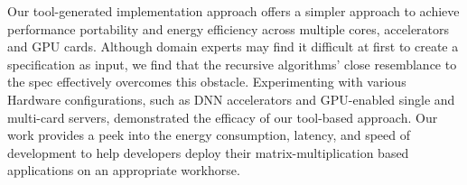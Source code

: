 Our tool-generated implementation approach offers a simpler approach to achieve performance portability and energy efficiency across multiple cores, accelerators and GPU cards. Although domain experts may find it difficult at first to create a specification as input, we find that the recursive algorithms' close resemblance to the spec effectively overcomes this obstacle. Experimenting with various Hardware configurations, such as DNN accelerators and GPU-enabled single and multi-card servers, demonstrated the efficacy of our tool-based approach. Our work provides a peek into the energy consumption, latency, and speed of development to help developers deploy their matrix-multiplication based applications on an appropriate workhorse. 